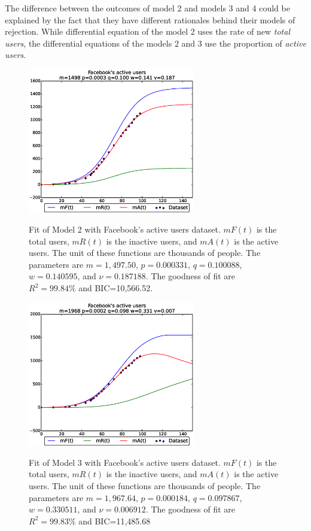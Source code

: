 The difference between the outcomes of model 2 and models 3 and 4 could be explained by the fact that they have different rationales behind their models of rejection. While differential equation of the model 2 uses the rate of new \textit{total users}, the differential equations of the models 2 and 3 use the proportion of \textit{active users}.

\begin{figure}
	\centering
	{\includegraphics*[scale=0.9,width=0.65\textwidth]{images03/fb-model2-1.eps}}
	\caption{Fit of Model 2 with Facebook's active users dataset.\label{fig:model2fit}
		{$mF(t)$ is the total users, $mR(t)$ is the inactive users, and $mA(t)$ is the active users. The unit of these functions are thousands of people. The parameters are $m=1,497.50$, $p=0.000331$, $q=0.100088$, $w=0.140595$, and $\nu=0.187188$. The goodness of fit are $R^2=99.84\%$ and BIC=10,566.52.}}
\end{figure}

\begin{figure}
	\centering
	{\includegraphics*[scale=0.9,width=0.65\textwidth]{images03/fb-model3-1.eps}}
	\caption{Fit of Model 3 with Facebook's active users dataset.\label{fig:model3fit}
		{$mF(t)$ is the total users, $mR(t)$ is the inactive users, and $mA(t)$ is the active users. The unit of these functions are thousands of people. The parameters are $m=1,967.64$, $p=0.000184$, $q=0.097867$, $w=0.330511$, and $\nu=0.006912$. The goodness of fit are $R^2=99.83\%$ and BIC=11,485.68}}
\end{figure}

